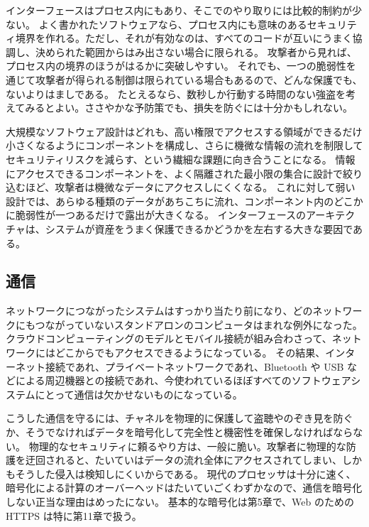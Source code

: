 \documentclass[uplatex]{jsarticle}
\def\label#1{}%
\begin{document}
インターフェースはプロセス内にもあり、そこでのやり取りには比較的制約が少ない。
よく書かれたソフトウェアなら、プロセス内にも意味のあるセキュリティ境界を作れる。ただし、それが有効なのは、すべてのコードが互いにうまく協調し、決められた範囲からはみ出さない場合に限られる。
攻撃者から見れば、プロセス内の境界のほうがはるかに突破しやすい。
それでも、一つの脆弱性を通じて攻撃者が得られる制御は限られている場合もあるので、どんな保護でも、ないよりはましである。
たとえるなら、数秒しか行動する時間のない強盗を考えてみるとよい。ささやかな予防策でも、損失を防ぐには十分かもしれない。

大規模なソフトウェア設計はどれも、高い権限でアクセスする領域ができるだけ小さくなるようにコンポーネントを構成し、さらに機微な情報の流れを制限してセキュリティリスクを減らす、という繊細な課題に向き合うことになる。
情報にアクセスできるコンポーネントを、よく隔離された最小限の集合に設計で絞り込むほど、攻撃者は機微なデータにアクセスしにくくなる。
これに対して弱い設計では、あらゆる種類のデータがあちこちに流れ、コンポーネント内のどこかに脆弱性が一つあるだけで露出が大きくなる。
インターフェースのアーキテクチャは、システムが資産をうまく保護できるかどうかを左右する大きな要因である。

\subsection{通信}\label{subsec:ch3-communication}

ネットワークにつながったシステムはすっかり当たり前になり、どのネットワークにもつながっていないスタンドアロンのコンピュータはまれな例外になった。
クラウドコンピューティングのモデルとモバイル接続が組み合わさって、ネットワークにはどこからでもアクセスできるようになっている。
その結果、インターネット接続であれ、プライベートネットワークであれ、Bluetooth や USB などによる周辺機器との接続であれ、今使われているほぼすべてのソフトウェアシステムにとって通信は欠かせないものになっている。

こうした通信を守るには、チャネルを物理的に保護して盗聴やのぞき見を防ぐか、そうでなければデータを暗号化して完全性と機密性を確保しなければならない。
物理的なセキュリティに頼るやり方は、一般に脆い。攻撃者に物理的な防護を迂回されると、たいていはデータの流れ全体にアクセスされてしまい、しかもそうした侵入は検知しにくいからである。
現代のプロセッサは十分に速く、暗号化による計算のオーバーヘッドはたいていごくわずかなので、通信を暗号化しない正当な理由はめったにない。
基本的な暗号化は第5章で、Web のための HTTPS は特に第11章で扱う。
\end{document}
